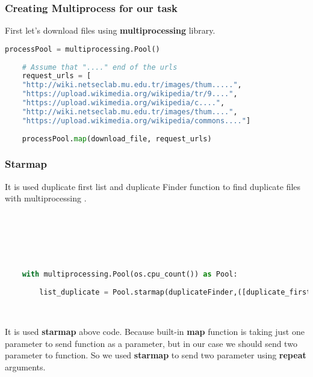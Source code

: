 \documentclass[onecolumn]{article}
\begin{document}
\subsubsection{Creating Multiprocess for our task}
First let's download files using \textbf{multiprocessing} library.\\

\begin{lstlisting}[language=Python, caption=Download File using Multiprocess]
    processPool = multiprocessing.Pool()
    
    # Assume that "...." end of the urls
    request_urls = [
    "http://wiki.netseclab.mu.edu.tr/images/thum.....",
    "https://upload.wikimedia.org/wikipedia/tr/9....",
    "https://upload.wikimedia.org/wikipedia/c....",
    "http://wiki.netseclab.mu.edu.tr/images/thum....",
    "https://upload.wikimedia.org/wikipedia/commons...."]
    
    processPool.map(download_file, request_urls)
\end{lstlisting}


\subsubsection{Starmap }

It is used duplicate first list and duplicate Finder function to find duplicate files with  multiprocessing .\\\\\\\\\\

\begin{lstlisting}[language=Python, caption=Starmap]

    with multiprocessing.Pool(os.cpu_count()) as Pool:
      
        list_duplicate = Pool.starmap(duplicateFinder,([duplicate_first[0],duplicate_first],[duplicate_first[1],duplicate_first],[duplicate_first[2],duplicate_first],[duplicate_first[3],duplicate_first],[duplicate_first[4],duplicate_first]))
   
\end{lstlisting}

\\It is used \textbf{starmap} above code. Because built-in \textbf{map} function is taking just one parameter to send function as a parameter, but in our case we should send two parameter to function. So we used \textbf{starmap} to send two parameter using \textbf{repeat} arguments.\\
\end{document}
